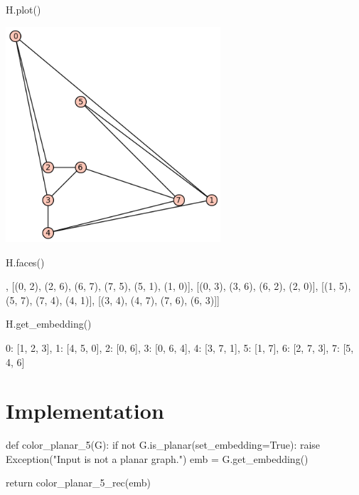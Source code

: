 \begin{sageCell}
    H.plot()
\end{sageCell}
\begin{outImage}
   \includegraphics[width=0.6\textwidth]{Images/5-coloring/planar_graph.png}
\end{outImage}

\begin{sageCell}
    H.faces()
\end{sageCell}
\begin{outCell}
    [[(0, 1), (1, 4), (4, 3), (3, 0)],
     [(0, 2), (2, 6), (6, 7), (7, 5), (5, 1), (1, 0)],
     [(0, 3), (3, 6), (6, 2), (2, 0)],
     [(1, 5), (5, 7), (7, 4), (4, 1)],
     [(3, 4), (4, 7), (7, 6), (6, 3)]]
\end{outCell}

\begin{sageCell}
    H.get_embedding()
\end{sageCell}
\begin{outCell}
    {0: [1, 2, 3],
     1: [4, 5, 0],
     2: [0, 6],
     3: [0, 6, 4],
     4: [3, 7, 1],
     5: [1, 7],
     6: [2, 7, 3],
     7: [5, 4, 6]}
\end{outCell}

\section{Implementation}

\begin{sageCell}
def color_planar_5(G):
    if not G.is_planar(set_embedding=True):
        raise Exception("Input is not a planar graph.")
    emb = G.get_embedding()

    return color_planar_5_rec(emb)
\end{sageCell}

